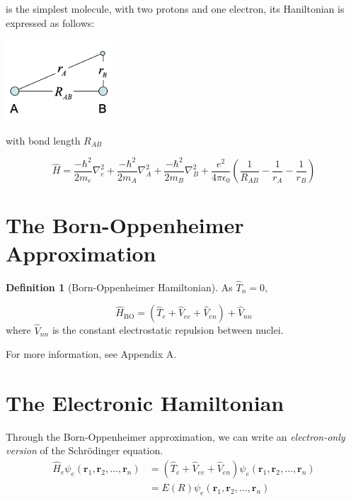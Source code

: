 \documentclass[a4paper]{tufte-handout}
\theoremstyle{definition}
\newtheorem{definition}{Definition}
\begin{document}
 is the simplest molecule, with two protons and one electron,
its Haniltonian is expressed as follows:

\begin{marginfigure}
  \includegraphics[width=40mm,scale=0.5]{h2_ion.png}
  \caption{ with bond length $R_{AB}$}
\end{marginfigure}

\begin{equation}
  \hat{H} = \frac{-\hbar^2}{2m_e}\nabla^2_e + \frac{-\hbar^2}{2m_A}\nabla^2_A + \frac{-\hbar^2}{2m_B}\nabla^2_B + \frac{e^2}{4\pi\epsilon_0} \left( \frac{1}{R_{AB}} - \frac{1}{r_{A}} - \frac{1}{r_{B}} \right)
\end{equation}

\section{The Born-Oppenheimer Approximation}

\begin{definition}[Born-Oppenheimer Hamiltonian]
  As $\hat{T}_{n} = 0$,

  \begin{equation}
    \hat{H}_{\mathrm{BO}} = \left( \hat{T}_{e} + \hat{V}_{ee} + \hat{V}_{en} \right) + \hat{V}_{nn}
  \end{equation}
  where $\hat{V}_{nn}$ is the constant electrostatic repulsion between nuclei.
\end{definition}

For more information, see Appendix A.

\section{The Electronic Hamiltonian}

Through the Born-Oppenheimer approximation, we can write an \textit{electron-only version} of the Schrödinger equation. 
\begin{align*}
  \hat{H}_e \psi_e(\mathbf{r}_1, \mathbf{r}_2, \dots, \mathbf{r}_n) &= \left( \hat{T}_{e} + \hat{V}_{ee} + \hat{V}_{en} \right) \psi_e(\mathbf{r}_1, \mathbf{r}_2, \dots, \mathbf{r}_n) \\
      &= E(R) \psi_e(\mathbf{r}_1, \mathbf{r}_2, \dots, \mathbf{r}_n)
\end{align*}
\end{document}
